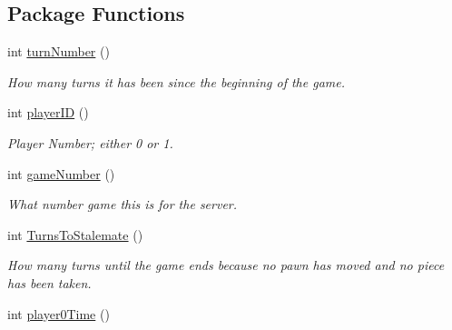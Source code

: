 \subsection*{Package Functions}
\begin{DoxyCompactItemize}
\item 
\hypertarget{classBaseAI_a19ade7391bfe101884a35f48fb840199}{
int \hyperlink{classBaseAI_a19ade7391bfe101884a35f48fb840199}{turnNumber} ()}
\label{classBaseAI_a19ade7391bfe101884a35f48fb840199}

\begin{DoxyCompactList}\small\item\em How many turns it has been since the beginning of the game. \item\end{DoxyCompactList}\item 
\hypertarget{classBaseAI_a16aab1036653c8f8fb5370cf2f6a3e10}{
int \hyperlink{classBaseAI_a16aab1036653c8f8fb5370cf2f6a3e10}{playerID} ()}
\label{classBaseAI_a16aab1036653c8f8fb5370cf2f6a3e10}

\begin{DoxyCompactList}\small\item\em Player Number; either 0 or 1. \item\end{DoxyCompactList}\item 
\hypertarget{classBaseAI_a50d3091db33b93c6f7c2d11dd64b4c7a}{
int \hyperlink{classBaseAI_a50d3091db33b93c6f7c2d11dd64b4c7a}{gameNumber} ()}
\label{classBaseAI_a50d3091db33b93c6f7c2d11dd64b4c7a}

\begin{DoxyCompactList}\small\item\em What number game this is for the server. \item\end{DoxyCompactList}\item 
\hypertarget{classBaseAI_a21e92638c7b53df6bbb2116c1f0f51c7}{
int \hyperlink{classBaseAI_a21e92638c7b53df6bbb2116c1f0f51c7}{TurnsToStalemate} ()}
\label{classBaseAI_a21e92638c7b53df6bbb2116c1f0f51c7}

\begin{DoxyCompactList}\small\item\em How many turns until the game ends because no pawn has moved and no piece has been taken. \item\end{DoxyCompactList}\item 
\hypertarget{classBaseAI_a0c98c065f57b1519d6daf72ef1c71d71}{
int \hyperlink{classBaseAI_a0c98c065f57b1519d6daf72ef1c71d71}{player0Time} ()}
\label{classBaseAI_a0c98c065f57b1519d6daf72ef1c71d71}


\end{DoxyCompactItemize}
